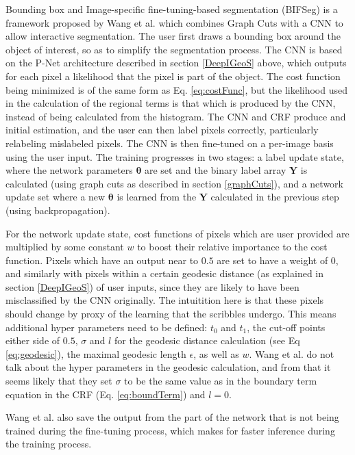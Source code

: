 Bounding box and Image-specific fine-tuning-based segmentation (BIFSeg) is a framework proposed by Wang et al. \cite{BIFSeg} which combines Graph Cuts with a CNN to allow interactive segmentation. The user first draws a bounding box around the object of interest, so as to simplify the segmentation process. The CNN is based on the P-Net architecture described in section \ref{DeepIGeoS} above, which outputs for each pixel a likelihood that the pixel is part of the object. The cost function being minimized is of the same form as Eq. \ref{eq:costFunc}, but the likelihood used in the calculation of the regional terms is that which is produced by the CNN, instead of being calculated from the histogram. The CNN and CRF produce and initial estimation, and the user can then label pixels correctly, particularly relabeling mislabeled pixels. The CNN is then fine-tuned on a per-image basis using the user input. The training progresses in two stages: a label update state, where the network parameters $\boldsymbol{\theta}$ are set and the binary label array $\mathbf{Y}$ is calculated (using graph cuts as described in section \ref{graphCuts}), and a network update set where a new $\boldsymbol{\theta}$ is learned from the $\mathbf{Y}$ calculated in the previous step (using backpropagation).

For the network update state, cost functions of pixels which are user provided are multiplied by some constant $w$ to boost their relative importance to the cost function. Pixels which have an output near to $0.5$ are set to have a weight of 0, and similarly with pixels within a certain geodesic distance (as explained in section \ref{DeepIGeoS}) of user inputs, since they are likely to have been misclassified by the CNN originally. The intuitition here is that these pixels should change by proxy of the learning that the scribbles undergo. This means additional hyper parameters need to be defined: $t_0$ and $t_1$, the cut-off points either side of $0.5$, $\sigma$ and $l$ for the geodesic distance calculation (see Eq \ref{eq:geodesic}), the maximal geodesic length $\epsilon$, as well as $w$. Wang et al. do not talk about the hyper parameters in the geodesic calculation, and from that it seems likely that they set $\sigma$ to be the same value as in the boundary term equation in the CRF (Eq. \ref{eq:boundTerm}) and $l=0$. 

Wang et al. also save the output from the part of the network that is not being trained during the fine-tuning process, which makes for faster inference during the training process. 